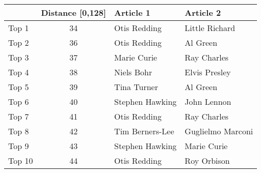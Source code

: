 \documentclass{article}
\begin{document}
\begin{tabular}{ l | c | l | l |}
& Distance [0,128] & Article 1 & Article 2  \\
  \hline          
Top 1 & 34 & Otis   Redding & Little   Richard\\
Top 2 & 36 & Otis   Redding & Al   Green\\
Top 3 & 37 & Marie   Curie & Ray   Charles\\
Top 4 & 38 & Niels   Bohr & Elvis   Presley\\
Top 5 & 39 & Tina   Turner & Al   Green\\
Top 6 & 40 & Stephen   Hawking & John   Lennon\\
Top 7 & 41 & Otis   Redding & Ray   Charles\\
Top 8 & 42 & Tim   Berners-Lee & Guglielmo   Marconi\\
Top 9 & 43 & Stephen   Hawking & Marie   Curie\\
Top 10 & 44 & Otis   Redding & Roy   Orbison    \\       
  \hline  
\end{tabular}
\end{document}
